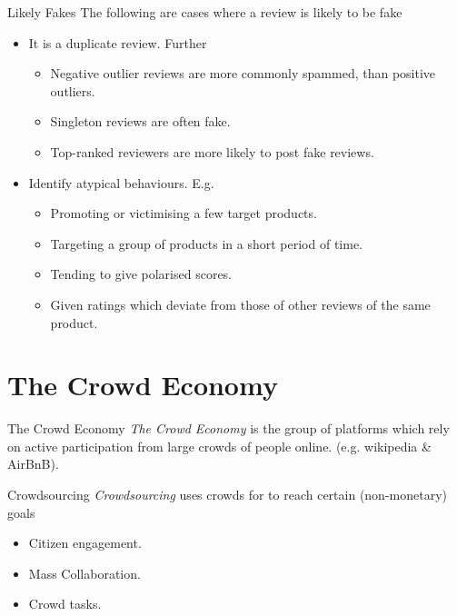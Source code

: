 \documentclass[11pt,a4paper]{article}
\begin{document}
\begin{proposition}{Likely Fakes}
  The following are cases where a review is likely to be fake
  \begin{itemize}
    \item It is a duplicate review. Further
    \begin{itemize}
      \item Negative outlier reviews are more commonly spammed, than positive outliers.
      \item Singleton reviews are often fake.
      \item Top-ranked reviewers are more likely to post fake reviews.
    \end{itemize}
    \item Identify atypical behaviours. E.g.
    \begin{itemize}
      \item Promoting or victimising a few target products.
      \item Targeting a group of products in a short period of time.
      \item Tending to give polarised scores.
      \item Given ratings which deviate from those of other reviews of the same product.
    \end{itemize}
  \end{itemize}
\end{proposition}

\section{The Crowd Economy }

\begin{definition}{The Crowd Economy}
  \textit{The Crowd Economy} is the group of platforms which rely on active participation from large crowds of people online. (e.g. wikipedia \& AirBnB).
\end{definition}

\begin{definition}{Crowdsourcing}
  \textit{Crowdsourcing} uses crowds for to reach certain (non-monetary) goals
  \begin{itemize}
    \item Citizen engagement.
    \item Mass Collaboration.
    \item Crowd tasks.
  \end{itemize}
\end{definition}
\end{document}
